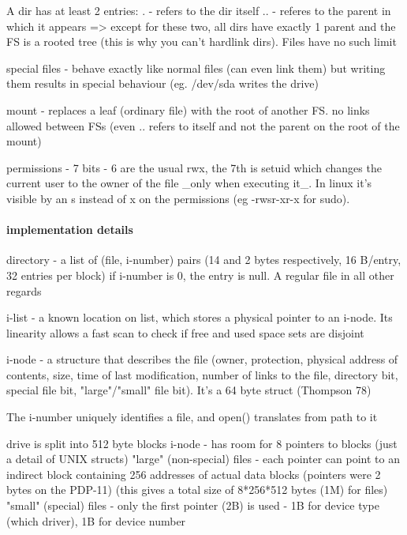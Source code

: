 \documentclass[a4paper]{article}
\begin{document}
        A dir has at least 2 entries:
            . - refers to the dir itself
            .. - referes to the parent in which it appears
        => except for these two, all dirs have exactly 1 parent and the FS is a
        rooted tree (this is why you can't hardlink dirs). Files have no such limit

        special files - behave exactly like normal files (can even link them)
        but writing them results in special behaviour (eg. /dev/sda writes the
        drive)

        mount - replaces a leaf (ordinary file) with the root of another FS.
        no links allowed between FSs (even .. refers to itself and not the
        parent on the root of the mount)

        permissions - 7 bits - 6 are the usual rwx, the 7th is setuid which
        changes the current user to the owner of the file \_only when executing
        it\_. In linux it's visible by an s instead of x on the permissions (eg
        -rwsr-xr-x for sudo).

        \paragraph{implementation details}

        directory - a list of (file, i-number) pairs (14 and 2 bytes
        respectively, 16 B/entry, 32 entries per block) if i-number is 0, the
        entry is null. A regular file in all other regards

        i-list - a known location on list, which stores a physical pointer to
        an i-node. Its linearity allows a fast scan to check if free and used
        space sets are disjoint

        i-node - a structure that describes the file (owner, protection,
        physical address of contents, size, time of last modification, number
        of links to the file, directory bit, special file bit, "large"/"small" file
        bit). It's a 64 byte struct (Thompson 78)

        The i-number uniquely identifies a file, and open() translates from
        path to it

        drive is split into 512 byte blocks
        i-node - has room for 8 pointers to blocks (just a detail of UNIX structs)
        "large" (non-special) files - each pointer can point to an indirect
        block containing 256 addresses of actual data blocks (pointers were 2
        bytes on the PDP-11) (this gives a total size of 8*256*512 bytes (1M)
        for files)
        "small" (special) files - only the first pointer (2B) is used - 1B for
        device type (which driver), 1B for device number
\end{document}

